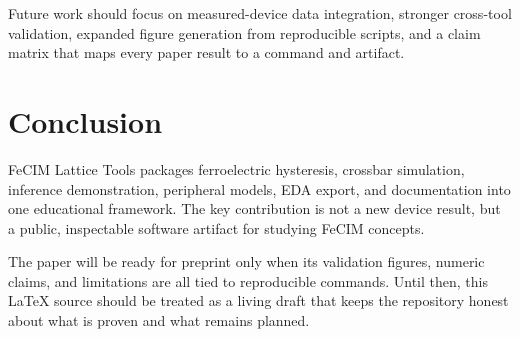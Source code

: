\documentclass[11pt]{article}
\newcommand{\project}{FeCIM Lattice Tools}
\begin{document}
Future work should focus on measured-device data integration, stronger cross-tool validation, expanded figure generation from reproducible scripts, and a claim matrix that maps every paper result to a command and artifact.

\section{Conclusion}

\project{} packages ferroelectric hysteresis, crossbar simulation, inference demonstration, peripheral models, EDA export, and documentation into one educational framework. The key contribution is not a new device result, but a public, inspectable software artifact for studying FeCIM concepts.

The paper will be ready for preprint only when its validation figures, numeric claims, and limitations are all tied to reproducible commands. Until then, this LaTeX source should be treated as a living draft that keeps the repository honest about what is proven and what remains planned.



\end{document}
